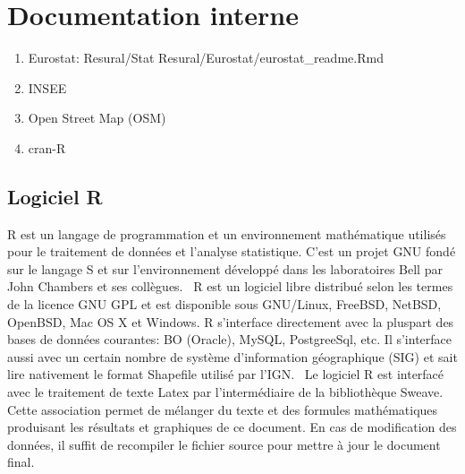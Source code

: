 \documentclass[12pt,english,french]{report}
\begin{document}
\chapter{Documentation interne}
\begin{enumerate}
  \item Eurostat: Resural\//Stat Resural\//Eurostat\//eurostat\_readme.Rmd
  \item INSEE
  \item Open Street Map (OSM)
  \item cran-R
\end{enumerate}

\section{Logiciel R}
R est un langage de programmation et un environnement mathématique utilisés pour le traitement de données et l'analyse statistique. C'est un projet GNU fondé sur le langage S et sur l'environnement développé dans les laboratoires Bell par John Chambers et ses collègues. 
\
R est un logiciel libre distribué selon les termes de la licence GNU GPL et est disponible sous GNU/Linux, FreeBSD, NetBSD, OpenBSD, Mac OS X et Windows. R s'interface directement avec la pluspart des bases de données courantes: BO (Oracle), MySQL, PostgreeSql, etc. Il s'interface aussi avec un certain nombre de système d'information géographique (SIG) et sait lire nativement le format Shapefile utilisé par l'IGN.
\
Le logiciel R est interfacé avec le traitement de texte Latex par l'intermédiaire de la bibliothèque Sweave. Cette association permet de mélanger du texte et des formules mathématiques produisant les résultats et graphiques de ce document. En cas de modification des données, il suffit de recompiler le fichier source pour mettre à jour le document final.
\

\printindex
\end{document}
